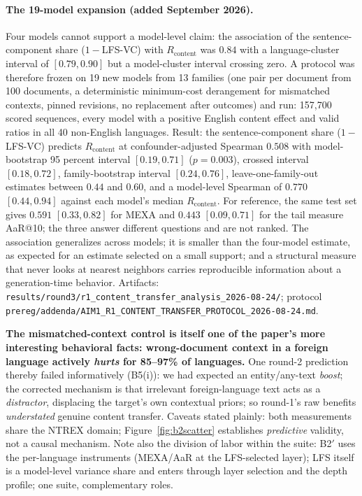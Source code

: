 \documentclass[11pt,a4paper]{article}
\begin{document}
\paragraph{The 19-model expansion (added September 2026).} Four models
cannot support a model-level claim: the association of the sentence-component share ($1-$LFS-VC)
with $R_{\mathrm{content}}$ was $0.84$ with a language-cluster interval of
$[0.79, 0.90]$ but a model-cluster interval crossing zero. A protocol was
therefore frozen on 19 new models from 13 families (one pair per document
from 100 documents, a deterministic minimum-cost derangement for mismatched
contexts, pinned revisions, no replacement after outcomes) and run: 157,700
scored sequences, every model with a positive English content effect and
valid ratios in all 40 non-English languages. Result: the sentence-component share ($1-$LFS-VC) predicts $R_{\mathrm{content}}$ at confounder-adjusted Spearman $0.508$ with
model-bootstrap 95 percent interval $[0.19, 0.71]$ ($p = 0.003$), crossed
interval $[0.18, 0.72]$, family-bootstrap interval $[0.24, 0.76]$,
leave-one-family-out estimates between $0.44$ and $0.60$, and a model-level
Spearman of $0.770$ $[0.44, 0.94]$ against each model's median
$R_{\mathrm{content}}$. For reference, the same test set gives $0.591$ $[0.33, 0.82]$ for MEXA
and $0.443$ $[0.09, 0.71]$ for the tail measure AaR@10; the three answer
different questions and are not ranked. The association generalizes across
models; it is smaller than the four-model estimate, as expected for an
estimate selected on a small support; and a structural measure that never
looks at nearest neighbors carries reproducible information about a
generation-time behavior. Artifacts:
\texttt{results/round3/r1\_content\_transfer\_analysis\_2026-08-24/}; protocol
\texttt{prereg/addenda/AIM1\_R1\_CONTENT\_TRANSFER\_PROTOCOL\_2026-08-24.md}.

\textbf{The mismatched-context control is itself one of the paper's more
interesting behavioral facts: wrong-document context in a foreign language
actively \emph{hurts} for 85--97\% of languages.} One round-2 prediction
thereby failed informatively (B5(i)): we had expected an entity/any-text
\emph{boost}; the corrected mechanism is that irrelevant foreign-language
text acts as a \emph{distractor}, displacing the target's own contextual
priors; so round-1's raw benefits \emph{understated} genuine content
transfer. Caveats stated plainly: both measurements share the NTREX domain; Figure~\ref{fig:b2scatter} establishes \emph{predictive} validity, not a
causal mechanism. Note also the division of labor within the suite: B2$'$
uses the per-language instruments (MEXA/AaR at the LFS-selected layer);
LFS itself is a model-level variance share and enters through layer
selection and the depth profile; one suite, complementary roles.
\end{document}
